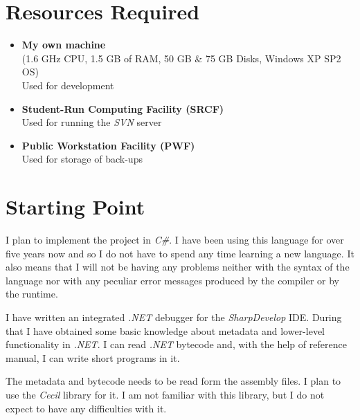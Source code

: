 \section*{Resources Required}
\begin{itemize}
	\item{\textbf{My own machine}\\
		(1.6 GHz CPU, 1.5 GB of RAM, 50 GB \& 75 GB Disks, 
		Windows XP SP2 OS) \\
		Used for development
	}
	\item{\textbf{Student-Run Computing Facility (SRCF)}\\
		Used for running the \emph{SVN} server
	}
	\item{\textbf{Public Workstation Facility (PWF)}\\
		Used for storage of back-ups
	}
\end{itemize}

\newpage

\section*{Starting Point}
I plan to implement the project in \emph{C\#}.  I have been using this 
language for over five years now and so I do not have to spend any time 
learning a new language.  It also means that I will not be having any 
problems neither with the syntax of the language nor with any peculiar 
error messages produced by the compiler or by the runtime.

I have written an integrated \emph{.NET} debugger for the 
\emph{SharpDevelop} IDE.  During that I have obtained some basic knowledge 
about metadata and lower-level functionality in \emph{.NET}.  I can read 
\emph{.NET} bytecode and, with the help of reference manual, I can write 
short programs in it.

The metadata and bytecode needs to be read form the assembly files. 
I plan to use the \emph{Cecil} library for it.  I am not familiar with this 
library, but I do not expect to have any difficulties with it.

